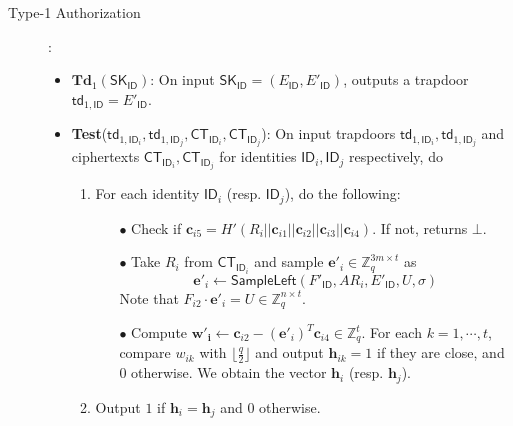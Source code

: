 \documentclass[runningheads,10pt]{llncs}
\def\ZZ{\mathbb{Z}}
\def\bf{\mathbf}
\def\SK{\mathsf{SK}}
\def\CT{\mathsf{CT}}
\def\SampleLeft{\mathsf{SampleLeft}}
\def\td{\mathsf{td}}
\def\e{\bf{e}}
\def\b{\bf{b}}
\def\c{\bf{c}}
\def\ID{\mathsf{ID}}
\begin{document}
\begin{description}
	\item[Type-1 Authorization]:
	\begin{itemize}
		\item $\textbf{Td}_1(\SK_\ID)$: On input $\SK_\ID=(E_\ID,E'_\ID)$, outputs a trapdoor $\td_{1,\ID}=E'_\ID$.
		\item \textbf{Test}($\td_{1,\ID_i},\td_{1,\ID_j},\CT_{\ID_i},\CT_{\ID_j}$): On input trapdoors $\td_{1,\ID_i}, \td_{1,\ID_j}$ and ciphertexts $\CT_{\ID_i},\CT_{\ID_j}$ for identities $\ID_i, \ID_j$ respectively, do 
		\begin{enumerate}
			\item For each identity $\ID_i$ (resp. $\ID_j$), do the following:
			\begin{itemize}
				\item[$\bullet$] Check if $\c_{i5}=H'(R_i||\c_{i1}||\c_{i2}||\c_{i3}||\c_{i4})$. If not, returns $\bot$.
				\item[$\bullet$] Take $R_i$ from $\CT_{\ID_i}$ and sample $\e'_i\in\ZZ_q^{3m\times t}$ as
				$$\e'_i\gets\SampleLeft(F'_\ID,AR_i,E'_\ID,U,\sigma)$$
				Note that $F_{i2}\cdot\e'_i=U\in\ZZ_q^{n\times t}$.
				\item[$\bullet$] Compute $\bf{w'_i}\gets\c_{i2}-(\e'_i)^T\c_{i4}\in\ZZ_q^t$. For each $k=1,\cdots, t$, compare $w_{ik}$ with $\lfloor\frac{q}{2}\rfloor$ and output $\bf{h}_{ik}=1$ if they are close, and $0$ otherwise. We obtain the vector $\bf{h}_i$ (resp. $\bf{h}_j$).
			\end{itemize}
			\item Output $1$ if  $\bf{h}_i=\bf{h}_j$ and $0$ otherwise.
		\end{enumerate}
	\end{itemize}
	

\end{description}
\end{document}
